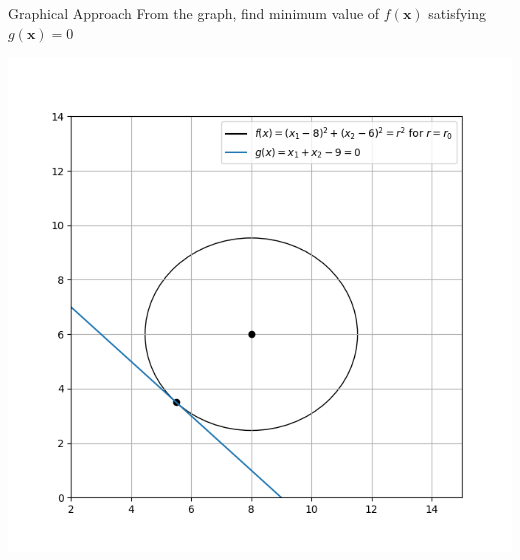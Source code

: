 \documentclass[10pt]{beamer}
\begin{document}
{
\begin{frame}{Graphical Approach}
From the graph, find minimum value of $f(\textbf{x})$ satisfying $g(\textbf{x}) = 0$
  \graphicspath{ {./images/} }
    \includegraphics[scale=0.45,center]{2D_2}
\end{frame}
}
\end{document}
